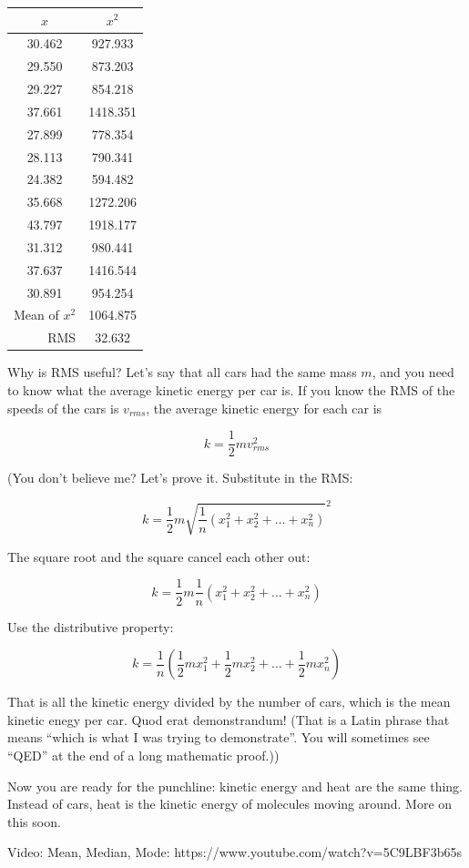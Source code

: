 \begin{tabular}{c |  c}
  $x$ & $x^2$ \\
  \hline
30.462 & 927.933 \\
29.550 & 873.203\\
29.227 & 854.218\\
37.661 & 1418.351\\
27.899 & 778.354\\
28.113 & 790.341\\
24.382 & 594.482\\
35.668 & 1272.206\\
43.797 & 1918.177\\
31.312 & 980.441\\
37.637 & 1416.544\\
30.891 & 954.254\\
\hline
\multicolumn{1}{r}{Mean of $x^2$} & {1064.875}\\
\multicolumn{1}{r}{RMS} & {32.632}
  \end{tabular}

Why is RMS useful? Let's say that all cars had the same mass $m$, and
you need to know what the average kinetic energy per car is. If you
know the RMS of the speeds of the cars is $v_{rms}$, the average kinetic energy for
each car is

$$k = \frac{1}{2}m v_{rms}^2$$

(You don't believe me? Let's prove it. Substitute in the RMS:

$$k = \frac{1}{2}m \sqrt{\frac{1}{n}\left( x_1^2 + x_2^2 + \ldots + x_n^2 \right)}^2$$

The square root and the square cancel each other out:

$$k = \frac{1}{2}m \frac{1}{n}\left( x_1^2 + x_2^2 + \ldots + x_n^2 \right)$$

Use the distributive property:

$$k = \frac{1}{n} \left( \frac{1}{2} m x_1^2 + \frac{1}{2}m x_2^2 + \ldots + \frac{1}{2}m x_n^2 \right)$$


That is all the kinetic energy divided by the number of cars, which is
the mean kinetic enegy per car. Quod erat demonstrandum! (That is a
Latin phrase that means ``which is what I was trying to
demonstrate''. You will sometimes see ``QED'' at the end of a long
mathematic proof.))

Now you are ready for the punchline: kinetic energy and heat are the
same thing. Instead of cars, heat is the kinetic energy of molecules
moving around. More on this soon.

Video: Mean, Median, Mode: https://www.youtube.com/watch?v=5C9LBF3b65s